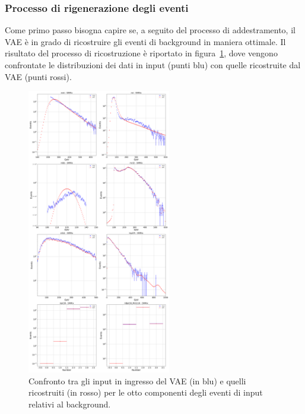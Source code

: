 \subsubsection{Processo di rigenerazione degli eventi}
\label{rigenerazione_eventi}
Come primo passo bisogna capire se, a seguito del processo di addestramento, il VAE è in grado di ricostruire gli eventi di background in maniera ottimale. Il risultato del processo di ricostruzione è riportato in figura~\ref{ricostruzione}, dove vengono confrontate le distribuzioni dei dati in input (punti blu) con quelle ricostruite dal VAE (punti rossi). 
\begin{figure}[h!]
	\centering
	\includegraphics[width=0.56\textwidth]{figs/risultati_simulazione/ricostruzione.png}
	\caption{Confronto tra gli input in ingresso del VAE (in blu) e quelli ricostruiti (in rosso) per le otto componenti degli eventi di input relativi al background.}
	\label{ricostruzione}
\end{figure}

